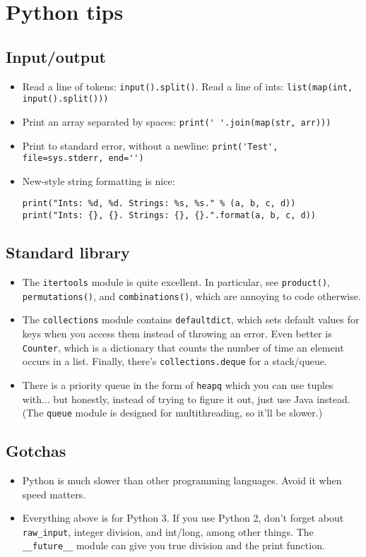 \documentclass{article}
\begin{document}
\section{Python tips}

\subsection{Input/output}

\begin{itemize}
    \item Read a line of tokens: \verb|input().split()|. Read a line of ints: \verb|list(map(int, input().split()))|
    \item Print an array separated by spaces: \verb|print(' '.join(map(str, arr)))|
    \item Print to standard error, without a newline: \verb|print('Test', file=sys.stderr, end='')|
    \item New-style string formatting is nice:
    \begin{lstlisting}
print("Ints: %d, %d. Strings: %s, %s." % (a, b, c, d))
print("Ints: {}, {}. Strings: {}, {}.".format(a, b, c, d))
\end{lstlisting}
\end{itemize}

\subsection{Standard library}

\begin{itemize}
    \item The \verb|itertools| module is quite excellent. In particular, see \verb|product()|, \verb|permutations()|, and \verb|combinations()|, which are annoying to code otherwise.
    \item The \verb|collections| module contains \verb|defaultdict|, which sets default values for keys when you access them instead of throwing an error. Even better is \verb|Counter|, which is a dictionary that counts the number of time an element occurs in a list. Finally, there's \verb|collections.deque| for a stack/queue.
    \item There is a priority queue in the form of \verb|heapq| which you can use tuples with... but honestly, instead of trying to figure it out, just use Java instead. (The \verb|queue| module is designed for multithreading, so it'll be slower.)
\end{itemize}

\subsection{Gotchas}

\begin{itemize}
    \item Python is much slower than other programming languages. Avoid it when speed matters.
    \item Everything above is for Python 3. If you use Python 2, don't forget about \verb|raw_input|, integer division, and int/long, among other things. The \verb|__future__| module can give you true division and the print function.
\end{itemize}
\end{document}
